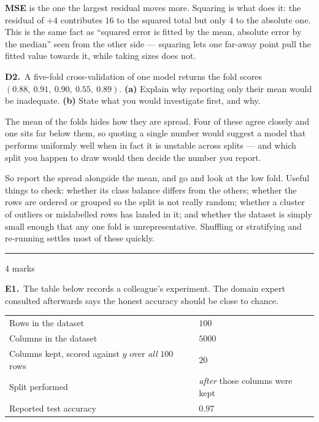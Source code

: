 \documentclass[10pt,a4paper]{article}
\newcommand{\parthead}[2]{\vspace{2pt}\noindent\rule{\linewidth}{0.4pt}\par\vspace{2pt}%
  \noindent{\bfseries Part #1}\hfill{\small #2}\par\vspace{1pt}}
\newcommand{\sol}[1]{\textbf{#1}}
\begin{document}
\sol{MSE} is the one the largest residual moves more. Squaring is what does it: the residual of $+4$ contributes $16$ to the squared total but only $4$ to the absolute one. This is the same fact as ``squared error is fitted by the mean, absolute error by the median'' seen from the other side --- squaring lets one far-away point pull the fitted value towards it, while taking sizes does not.

\vspace{6pt}

\textbf{D2.}\ A five-fold cross-validation of one model returns the fold scores $(0.88,\ 0.91,\ 0.90,\ 0.55,\ 0.89)$. \textbf{(a)} Explain why reporting only their mean would be inadequate. \textbf{(b)} State what you would investigate first, and why.

\vspace{2pt}

The mean of the folds hides how they are spread. Four of these agree closely and one sits far below them, so quoting a single number would suggest a model that performs uniformly well when in fact it is unstable across splits --- and which split you happen to draw would then decide the number you report.\par\vspace{1mm}So report the spread alongside the mean, and go and look at the low fold. Useful things to check: whether its class balance differs from the others; whether the rows are ordered or grouped so the split is not really random; whether a cluster of outliers or mislabelled rows has landed in it; and whether the dataset is simply small enough that any one fold is unrepresentative. Shuffling or stratifying and re-running settles most of these quickly.

\newpage

\parthead{E --- Reasoning}{4 marks}

\textbf{E1.}\ The table below records a colleague's experiment. The domain expert consulted afterwards says the
honest accuracy should be close to chance.

\vspace{2mm}
\begin{center}\small
\begin{tabular}{@{}ll@{}}
\hline
\rule{0pt}{11pt}Rows in the dataset & $100$\\
Columns in the dataset & $5000$\\
Columns kept, scored against $y$ over \emph{all} $100$ rows & $20$\\
Split performed & \emph{after} those columns were kept\\
Reported test accuracy & $\mathbf{0.97}$\\[2pt]
\hline
\end{tabular}
\end{center}
\end{document}
